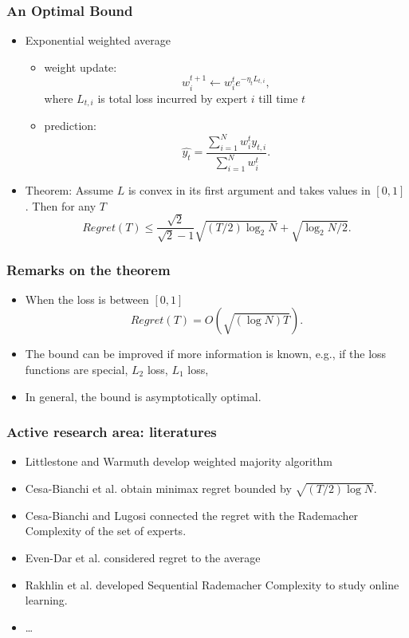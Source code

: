 \documentclass{beamer}
\begin{document}
\begin{frame}
\frametitle{An Optimal Bound}
\begin{itemize}
\item Exponential weighted average

\begin{itemize}
\item weight update:
$$w_i^{t+1} \leftarrow w_i^t e^{-\eta_t L_{t,i}},$$
where $L_{t,i}$ is total loss incurred by expert $i$ till time $t$
\item prediction:
$$\hat{y_t} = \frac{\sum_{i=1}^Nw_{i}^ty_{t,i}}{\sum_{i=1}^Nw_{i}^t}.$$ 
\end{itemize}
\pause
\item Theorem: Assume $L$ is convex in its first argument and takes values in $[0,1]$. Then for any $T$
$$Regret(T)\le \frac{\sqrt{2}}{\sqrt{2}-1}\sqrt{(T/2)\log_2 N}+\sqrt{\log_2 N/2}.$$


\end{itemize}


\end{frame}
\begin{frame}
\frametitle{Remarks on the theorem}
\begin{itemize}
\item When the loss is between $[0,1]$ 
$$Regret(T) = O(\sqrt{(\log N) T}).$$
\pause
\item The bound can be improved if more information is known, e.g., if the loss functions are special, $L_2$ loss, $L_1$ loss, 
\pause
\item In general, the bound is asymptotically optimal. 

\end{itemize}


\end{frame}



\begin{frame}
\frametitle{Active research area: literatures}
\begin{itemize}
\item Littlestone and Warmuth develop {\color{blue}weighted majority algorithm}
\item Cesa-Bianchi et al. obtain minimax regret bounded by $\sqrt{(T/2)\log N}.$
\item Cesa-Bianchi and Lugosi connected the regret with the Rademacher Complexity of the set of experts.
\item Even-Dar et al. considered regret to the average

\item Rakhlin et al. developed {\color{blue}Sequential Rademacher Complexity} to study online learning.
\item \ldots
\end{itemize}


\end{frame}
\end{document}
